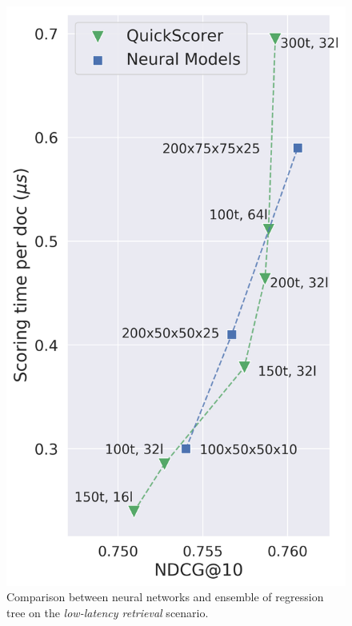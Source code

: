 \begin{figure}[t]
\begin{minipage}[b]{0.51\columnwidth}
\includegraphics[width=\columnwidth]{imgs/low_effectiveness_istella_stretched.png}
\centering 
\caption*{\footnotesize{\istella}}
\end{minipage}%
\caption{Comparison between neural networks and ensemble of regression tree on the \textit{low-latency retrieval} scenario.}
\label{fig:lowlat}
\end{figure}



